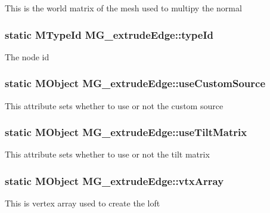 This is the world matrix of the mesh used to multipy the normal \hypertarget{class_m_g__extrude_edge_aaed482a60e12f396d096d215a6e42cdb}{
\subsubsection[{type\-Id}]{\setlength{\rightskip}{0pt plus 5cm}static M\-Type\-Id M\-G\-\_\-extrude\-Edge\-::type\-Id\hspace{0.3cm}{\ttfamily [static]}}}\label{class_m_g__extrude_edge_aaed482a60e12f396d096d215a6e42cdb}
The node id \hypertarget{class_m_g__extrude_edge_a48540ff0750d6a192422b99ab9041559}{
\subsubsection[{use\-Custom\-Source}]{\setlength{\rightskip}{0pt plus 5cm}static M\-Object M\-G\-\_\-extrude\-Edge\-::use\-Custom\-Source\hspace{0.3cm}{\ttfamily [static]}}}\label{class_m_g__extrude_edge_a48540ff0750d6a192422b99ab9041559}
This attribute sets whether to use or not the custom source \hypertarget{class_m_g__extrude_edge_ac48bec269a369720c8c9a6c2b4019a32}{
\subsubsection[{use\-Tilt\-Matrix}]{\setlength{\rightskip}{0pt plus 5cm}static M\-Object M\-G\-\_\-extrude\-Edge\-::use\-Tilt\-Matrix\hspace{0.3cm}{\ttfamily [static]}}}\label{class_m_g__extrude_edge_ac48bec269a369720c8c9a6c2b4019a32}
This attribute sets whether to use or not the tilt matrix \hypertarget{class_m_g__extrude_edge_ad2e8f28509086a9e64d6809da10a500d}{
\subsubsection[{vtx\-Array}]{\setlength{\rightskip}{0pt plus 5cm}static M\-Object M\-G\-\_\-extrude\-Edge\-::vtx\-Array\hspace{0.3cm}{\ttfamily [static]}}}\label{class_m_g__extrude_edge_ad2e8f28509086a9e64d6809da10a500d}
This is vertex array used to create the loft 

